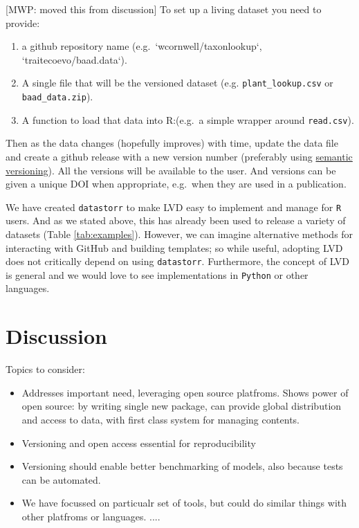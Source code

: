 \documentclass[a4paper,11pt]{article}
\begin{document}
[MWP: moved this from discussion]
To set up a
living dataset you need to provide:
\begin{enumerate}
  \item a github repository name (e.g.~`wcornwell/taxonlookup`, `traitecoevo/baad.data`).
  \item A single file that will be the versioned dataset (e.g. \texttt{plant\_lookup.csv} or \texttt{baad\_data.zip}).
  \item A function to load that data into R:(e.g.~a simple wrapper around \texttt{read.csv}).
\end{enumerate}

Then as the data changes (hopefully improves) with time, update the data
file and create a github release with a new version number (preferably
using \href{http://semver.org/}{semantic versioning}). All the versions
will be available to the user. And versions can be given a unique DOI
when appropriate, e.g.~when they are used in a publication.


We have created \texttt{datastorr} to make LVD easy to implement and manage for \texttt{R} users. And as we stated above, this has already been used to release a variety of datasets (Table \ref{tab:examples}). However, we can imagine alternative methods for interacting with GitHub and building templates; so while useful, adopting LVD does not critically depend on using \texttt{datastorr}. Furthermore, the concept of LVD is general and we would love to see implementations in \texttt{Python} or other languages. 

\section{Discussion}

Topics to consider:

\begin{itemize}

\item Addresses important need, leveraging open source platfroms. Shows power of open source: by writing single new package, can provide global distribution and access to data, with first class system for managing contents.
\item Versioning and open access essential for reproducibility
\item Versioning should enable better benchmarking of models, also because tests can be automated.
\item We have focussed on particualr set of tools, but could do similar things with other platfroms or languages.
....
\end{itemize}
\end{document}
